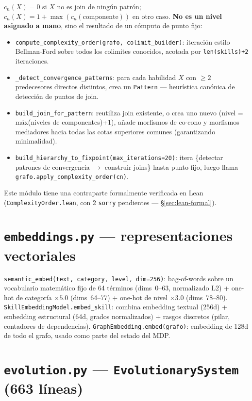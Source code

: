 \documentclass[11pt,a4paper]{report}
\newcommand{\code}[1]{\texttt{#1}}
\begin{document}
$c_n(X)=0$ si $X$ no es join de ning\'un patr\'on; $c_n(X)=1+\max(c_n(\text{componente}))$ en otro caso. \textbf{No es un nivel asignado a mano}, sino el resultado de un c\'omputo de punto fijo:
\begin{itemize}
  \item \code{compute_complexity_order(grafo, colimit_builder)}: iteraci\'on estilo Bellman-Ford sobre todos los colimites conocidos, acotada por \code{len(skills)+2} iteraciones.
  \item \code{\_detect_convergence_patterns}: para cada habilidad $X$ con $\ge2$ predecesores directos distintos, crea un \code{Pattern} --- heur\'istica can\'onica de detecci\'on de puntos de join.
  \item \code{build_join_for_pattern}: reutiliza join existente, o crea uno nuevo (nivel = m\'ax(niveles de componentes)+1), a\~nade morfismos de co-cono y morfismos mediadores hacia todas las cotas superiores comunes (garantizando minimalidad).
  \item \code{build_hierarchy_to_fixpoint(max_iterations=20)}: itera \{detectar patrones de convergencia $\to$ construir joins\} hasta punto fijo, luego llama \code{grafo.apply_complexity_order(cn)}.
\end{itemize}
Este m\'odulo tiene una contraparte formalmente verificada en Lean (\code{ComplexityOrder.lean}, con 2 \code{sorry} pendientes --- \S\ref{sec:lean-formal}).

\section{\code{embeddings.py} --- representaciones vectoriales}

\code{semantic_embed(text, category, level, dim=256)}: bag-of-words sobre un vocabulario matem\'atico fijo de 64 t\'erminos (dims~0--63, normalizado L2) + one-hot de categor\'ia $\times5.0$ (dims~64--77) + one-hot de nivel $\times3.0$ (dims~78--80). \code{SkillEmbeddingModel.embed_skill}: combina embedding textual (256d) + embedding estructural (64d, grados normalizados) + rasgos discretos (pilar, contadores de dependencias). \code{GraphEmbedding.embed(grafo)}: embedding de 128d de todo el grafo, usado como parte del estado del MDP.

\section{\code{evolution.py} --- \code{EvolutionarySystem} (663 l\'ineas)}
\end{document}

